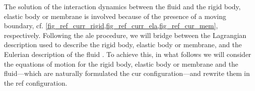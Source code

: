 The solution of the interaction dynamics between the fluid and the rigid body, elastic body or membrane is  involved because of the presence of a moving boundary, cf. \cref{fig_ref_curr_rigid,fig_ref_curr_ela,fig_ref_cur_mem}, respectively. Following the \ac{ale} procedure, we will  bridge between the Lagrangian   description used to describe the rigid body, elastic body or membrane, and the Eulerian description of the fluid  \cite{kamenskyLectureNotesMAE}. To achieve this, in what follows we will consider the equations of motion for the rigid body, elastic body or membrane and the fluid---which are naturally formulated the \ac{cur} configuration---and  rewrite them in the \ac{ref} configuration.









